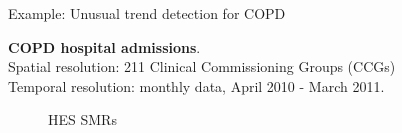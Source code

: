 \documentclass[slidestop,compress,serif,10pt]{beamer}
\begin{document}
\begin{frame}{Example: Unusual trend detection for COPD}

 \begin{block}{}
{\bf COPD hospital admissions}.\\ Spatial resolution: 211 Clinical Commissioning Groups (CCGs)\\
Temporal resolution: monthly data, April 2010 - March 2011.\\
\end{block}
\centering
\begin{figure}\caption{HES SMRs}
\end{figure}
\end{frame}
\end{document}
